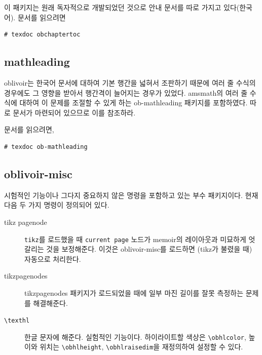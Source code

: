 \documentclass[
	12pt,
	a4paper,
	kosection,
	footnote,
	nobookmarks,
	microtype,
	figtabcapt,
]{oblivoir}
\def\cs#1{\texttt{\textbackslash #1}}
\begin{document}
\begin{boxedverbatim}
\usepackage{obchaptertoc}
\chaptertoc
\end{boxedverbatim}

이 패키지는 원래 독자적으로 개발되었던 것으로 안내 문서를 따로 가지고 있다(한국어).
문서를 읽으려면
\begin{verbatim}
# texdoc obchaptertoc
\end{verbatim}

\subsection{mathleading}

oblivoir는 한국어 문서에 대하여 기본 행간을 넓혀서 조판하기 때문에 여러 줄 수식의 경우에도
그 영향을 받아서 행간격이 늘어지는 경우가 있었다.
\textsf{amsmath}의 여러 줄 수식에 대하여 이 문제를 조절할 수 있게 하는 \textsf{ob-mathleading}
패키지를 포함하였다. 따로 문서가 마련되어 있으므로 이를 참조하라.

\begin{boxedverbatim}
\usepackage{ob-mathleading}
\end{boxedverbatim}

문서를 읽으려면,
\begin{verbatim}
# texdoc ob-mathleading
\end{verbatim}

\subsection{oblivoir-misc}

시험적인 기능이나 그다지 중요하지 않은 명령을 포함하고 있는 
부수 패키지이다. 현재 다음 두 가지 명령이 정의되어 있다.

\begin{description}
\item[tikz pagenode] \texttt{tikz}를 로드했을 때 \texttt{current page}
노드가 memoir의 레이아웃과 미묘하게 엇갈리는 것을 보정해준다. 이것은 oblivoir-misc를 로드하면 (tikz가 불렸을 때) 자동으로 처리한다.
\item[tikzpagenodes] tikzpagenodes 패키지가 로드되었을 때에 일부 마진 길이를
잘못 측정하는 문제를 해결해준다.
\item[\cs{texthl}] 한글 문자에 해준다. 실험적인 기능이다.
하이라이트할 색상은 \cs{obhlcolor}, 높이와
위치는 \cs{obhlheight}, \cs{obhlraisedim}을 재정의하여 설정할 수 있다.
\end{description}
\end{document}
